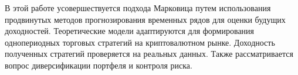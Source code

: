 В этой работе усовершествуется подхода Марковица путем использования продвинутых методов прогнозирования временных рядов для оценки будущих доходностей.
Теоретические модели адаптируются для формирования однопериодных торговых стратегий на криптовалютном рынке. Доходность полученных стратегий проверяется
на реальных данных. Также рассматривается вопрос диверсификации портфеля и контроля риска.